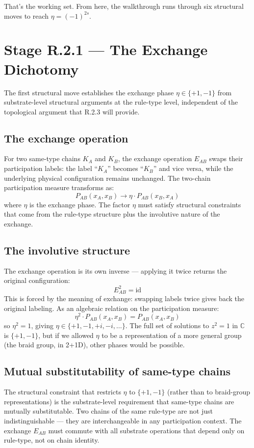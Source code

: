 \documentclass[11pt,a4paper]{article}
\begin{document}
That's the working set. From here, the walkthrough runs through six structural moves to reach $\eta = (-1)^{2s}$.

\section{Stage R.2.1 --- The Exchange Dichotomy}

The first structural move establishes the exchange phase $\eta \in \{+1, -1\}$ from substrate-level structural arguments at the rule-type level, independent of the topological argument that R.2.3 will provide.

\subsection{The exchange operation}

For two same-type chains $K_A$ and $K_B$, the exchange operation $E_{AB}$ swaps their participation labels: the label ``$K_A$'' becomes ``$K_B$'' and vice versa, while the underlying physical configuration remains unchanged. The two-chain participation measure transforms as:
\[
P_{AB}(x_A, x_B) \to \eta \cdot P_{AB}(x_B, x_A)
\]
where $\eta$ is the exchange phase. The factor $\eta$ must satisfy structural constraints that come from the rule-type structure plus the involutive nature of the exchange.

\subsection{The involutive structure}

The exchange operation is its own inverse --- applying it twice returns the original configuration:
\[
E_{AB}^{2} = \mathrm{id}
\]
This is forced by the meaning of exchange: swapping labels twice gives back the original labeling. As an algebraic relation on the participation measure:
\[
\eta^{2} \cdot P_{AB}(x_A, x_B) = P_{AB}(x_A, x_B)
\]
so $\eta^{2} = 1$, giving $\eta \in \{+1, -1, +i, -i, \ldots\}$. The full set of solutions to $z^{2} = 1$ in $\mathbb{C}$ is $\{+1, -1\}$, but if we allowed $\eta$ to be a representation of a more general group (the braid group, in 2+1D), other phases would be possible.

\subsection{Mutual substitutability of same-type chains}

The structural constraint that restricts $\eta$ to $\{+1, -1\}$ (rather than to braid-group representations) is the substrate-level requirement that same-type chains are mutually substitutable. Two chains of the same rule-type are not just indistinguishable --- they are interchangeable in any participation context. The exchange $E_{AB}$ must commute with all substrate operations that depend only on rule-type, not on chain identity.
\end{document}
